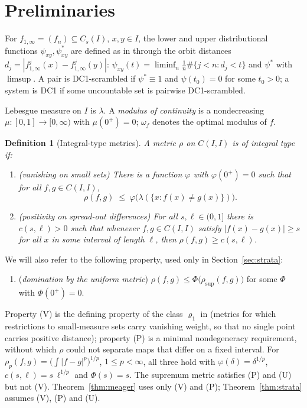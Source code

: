 \documentclass[11pt]{article}
\newtheorem{definition}[theorem]{Definition}
\newcommand{\I}{I}
\newcommand{\Cs}{C_s(\I)}
\newcommand{\CI}{C(\I,\I)}
\newcommand{\rsup}{\rho_{\sup}}
\begin{document}
\section{Preliminaries}\label{sec:prelim}

For $f_{1,\infty}=(f_n)\subseteq\Cs$, $x,y\in\I$, the lower and upper
distributional functions $\psi_{xy},\psi^*_{xy}$ are defined as in
\cite{BR,companion} through the orbit distances
$d_j=|f^j_{1,\infty}(x)-f^j_{1,\infty}(y)|$:
$\psi_{xy}(t)=\liminf_n\frac1n\#\{j<n:d_j<t\}$ and $\psi^*$ with $\limsup$.  A pair
is DC1-scrambled if $\psi^*\equiv1$ and $\psi(t_0)=0$ for some $t_0>0$; a system is
DC1 if some uncountable set is pairwise DC1-scrambled.

Lebesgue measure on $\I$ is $\lambda$.  A \emph{modulus of continuity} is a
nondecreasing $\mu:[0,1]\to[0,\infty)$ with $\mu(0^+)=0$; $\omega_f$ denotes the
optimal modulus of $f$.

\begin{definition}[Integral-type metrics]\label{def:integral}
A metric $\rho$ on $\CI$ is of \emph{integral type} if:
\begin{enumerate}
\item[(V)] (\emph{vanishing on small sets})  There is a function $\varphi$ with
$\varphi(0^+)=0$ such that for all $f,g\in\CI$,
\[
\rho(f,g)\;\le\;\varphi\bigl(\lambda(\{x:f(x)\ne g(x)\})\bigr).
\]
\item[(P)] (\emph{positivity on spread-out differences})  For all $s,\ell\in(0,1]$
there is $c(s,\ell)>0$ such that whenever $f,g\in\CI$ satisfy
$|f(x)-g(x)|\ge s$ for all $x$ in some interval of length $\ell$, then
$\rho(f,g)\ge c(s,\ell)$.
\end{enumerate}
\end{definition}

We will also refer to the following property, used only in
Section~\ref{sec:strata}:
\begin{enumerate}
\item[(U)] (\emph{domination by the uniform metric})
$\rho(f,g)\le\Phi\bigl(\rsup(f,g)\bigr)$ for some $\Phi$ with $\Phi(0^+)=0$.
\end{enumerate}
Property (V) is the defining property of the class $\varrho_1$ in
\cite[Remark 1]{BR} (metrics for which restrictions to small-measure sets carry
vanishing weight, so that no single point carries positive distance); property (P)
is a minimal nondegeneracy requirement, without which $\rho$ could not separate
maps that differ on a fixed interval.  For $\rho_p(f,g)=\bigl(\int|f-g|^p\bigr)^{1/p}$,
$1\le p<\infty$, all three hold with $\varphi(\delta)=\delta^{1/p}$,
$c(s,\ell)=s\,\ell^{1/p}$ and $\Phi(s)=s$.  The supremum metric satisfies (P) and
(U) but not (V).  Theorem~\ref{thm:meager} uses only (V) and (P);
Theorem~\ref{thm:strata} assumes (V), (P) and (U).
\end{document}
